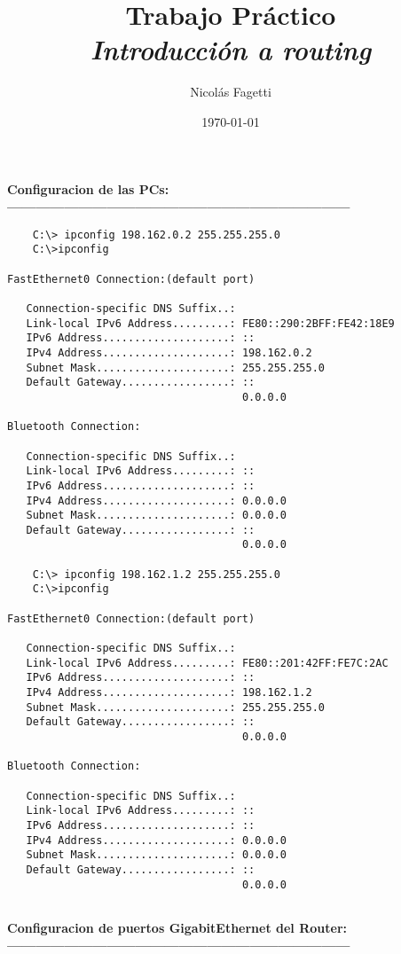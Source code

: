 \documentclass{article}
\title{ Trabajo Práctico \\ 
    \vspace{15}
    \textit{Introducci\'on a routing} \\
}
\author{Nicolás Fagetti}
\date{\today}
\begin{document}
\maketitle

\textbf{
Configuracion de las PCs: \\
------------------------------------------------------------------------ \\
}
\begin{verbatim}
    C:\> ipconfig 198.162.0.2 255.255.255.0
    C:\>ipconfig

FastEthernet0 Connection:(default port)

   Connection-specific DNS Suffix..: 
   Link-local IPv6 Address.........: FE80::290:2BFF:FE42:18E9
   IPv6 Address....................: ::
   IPv4 Address....................: 198.162.0.2
   Subnet Mask.....................: 255.255.255.0
   Default Gateway.................: ::
                                     0.0.0.0

Bluetooth Connection:

   Connection-specific DNS Suffix..: 
   Link-local IPv6 Address.........: ::
   IPv6 Address....................: ::
   IPv4 Address....................: 0.0.0.0
   Subnet Mask.....................: 0.0.0.0
   Default Gateway.................: ::
                                     0.0.0.0

    C:\> ipconfig 198.162.1.2 255.255.255.0
    C:\>ipconfig

FastEthernet0 Connection:(default port)

   Connection-specific DNS Suffix..: 
   Link-local IPv6 Address.........: FE80::201:42FF:FE7C:2AC
   IPv6 Address....................: ::
   IPv4 Address....................: 198.162.1.2
   Subnet Mask.....................: 255.255.255.0
   Default Gateway.................: ::
                                     0.0.0.0

Bluetooth Connection:

   Connection-specific DNS Suffix..: 
   Link-local IPv6 Address.........: ::
   IPv6 Address....................: ::
   IPv4 Address....................: 0.0.0.0
   Subnet Mask.....................: 0.0.0.0
   Default Gateway.................: ::
                                     0.0.0.0
                                     
\end{verbatim}
\textbf{
Configuracion de puertos GigabitEthernet del Router: \\
------------------------------------------------------------------------ \\
}
\end{document}
